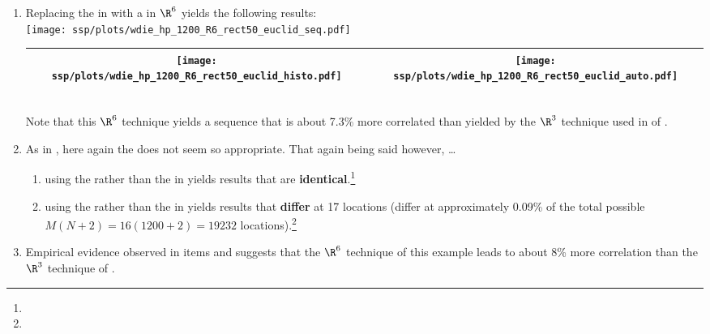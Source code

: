 \begin{example}
\begin{enumerate}
  \item \label{item:wdie_hp_R6_rect50_euclid}
        Replacing the  in 
        with a  in $\R^6$ yields the following results:
        \\\texttt{[image: ssp/plots/wdie\_hp\_1200\_R6\_rect50\_euclid\_seq.pdf]}
        \\\begin{tabular}{|>{\scs}c|>{\scs}c|}
             \hline
             \texttt{[image: ssp/plots/wdie\_hp\_1200\_R6\_rect50\_euclid\_histo.pdf]}
            &\texttt{[image: ssp/plots/wdie\_hp\_1200\_R6\_rect50\_euclid\_auto.pdf]}
           \\\hline
        \end{tabular}\\
     Note that this $\R^6$ technique yields a sequence that is about 7.3\% more correlated than yielded by the $\R^3$ technique
     used in  of .

  \item As in , here again the  does not seem so appropriate.
        That again being said however, \ldots 
    \begin{enumerate}
      \item using the  rather than the  in 
             yields results that are 
            \textbf{identical}.\footnote{} %
      \item using the  rather than the  in 
             yields results that \textbf{differ} at 17 locations
            (differ at approximately 0.09\% of the total possible $M(N+2)=16(1200+2)=19232$ 
            locations).\footnote{} %
    \end{enumerate}

  \item Empirical evidence observed in items
                     and
        suggests that the $\R^6$ technique of this example leads to about 8\% more correlation 
        than the $\R^3$ technique of .

\end{enumerate}
\end{example}



